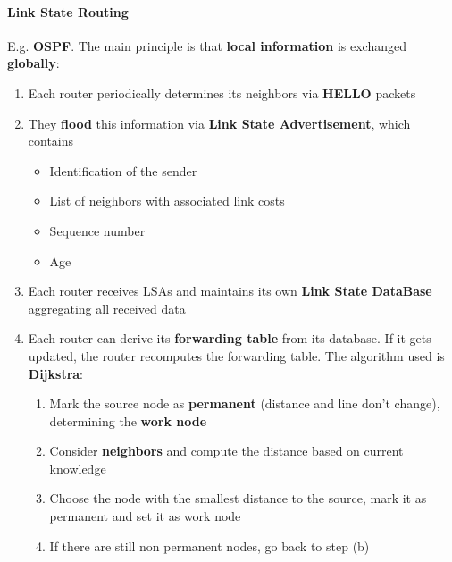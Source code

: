 \paragraph{Link State Routing} E.g. \textbf{OSPF}. The main principle is that \textbf{local information} is exchanged \textbf{globally}:
\begin{enumerate}
	\item Each router periodically determines its neighbors via \textbf{HELLO} packets
	\item They \textbf{flood} this information via \textbf{Link State Advertisement}, which contains
	\begin{itemize}
		\item Identification of the sender
		\item List of neighbors with associated link costs
		\item Sequence number
		\item Age
	\end{itemize}
	\item Each router receives LSAs and maintains its own \textbf{Link State DataBase} aggregating all received data
	\item Each router can derive its \textbf{forwarding table} from its database. If it gets updated, the router recomputes the forwarding table. The algorithm used is \textbf{Dijkstra}:
	\begin{enumerate}
		\item Mark the source node as \textbf{permanent} (distance and line don't change), determining the \textbf{work node}
		\item Consider \textbf{neighbors} and compute the distance based on current knowledge
		\item Choose the node with the smallest distance to the source, mark it as permanent and set it as work node
		\item If there are still non permanent nodes, go back to step (b)
	\end{enumerate}
\end{enumerate}

